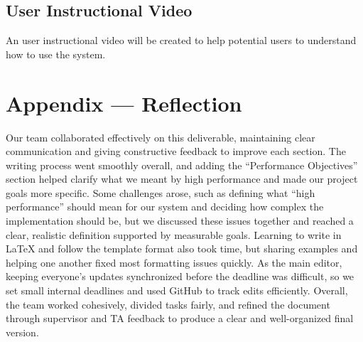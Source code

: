 \documentclass{article}
\begin{document}
\subsection{User Instructional Video}

An user instructional video will be created to help potential users to
understand how to use the system.

\newpage{}

\section*{Appendix --- Reflection}

Our team collaborated effectively on this deliverable, maintaining clear communication and giving constructive feedback to improve each section. The writing process went smoothly overall, and adding the “Performance Objectives” section helped clarify what we meant by high performance and made our project goals more specific. Some challenges arose, such as defining what “high performance” should mean for our system and deciding how complex the implementation should be, but we discussed these issues together and reached a clear, realistic definition supported by measurable goals. Learning to write in \LaTeX{} and follow the template format also took time, but sharing examples and helping one another fixed most formatting issues quickly. As the main editor, keeping everyone’s updates synchronized before the deadline was difficult, so we set small internal deadlines and used GitHub to track edits efficiently. Overall, the team worked cohesively, divided tasks fairly, and refined the document through supervisor and TA feedback to produce a clear and well-organized final version.




\end{document}
